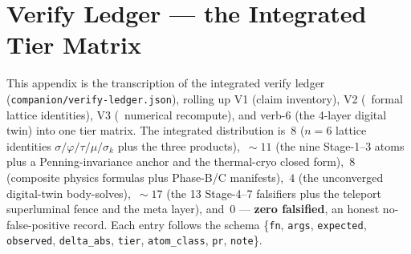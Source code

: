 \section{Verify Ledger --- the Integrated Tier Matrix}
\label{app:ledger}

This appendix is the transcription of the integrated verify ledger
(\texttt{companion/verify-ledger.json}), rolling up V1 (claim
inventory), V2 (\tierBlue\ formal lattice identities), V3 (\tierGreen\
numerical recompute), and verb-6 (the 4-layer digital twin) into one
tier matrix. The integrated distribution is \tierBlue$\,8$
($n\!=\!6$ lattice identities $\sigma/\varphi/\tau/\mu/\sigma_k$ plus the
three products), \tierGreen$\,\sim\!11$ (the nine Stage-1--3 atoms plus a
Penning-invariance anchor and the thermal-cryo closed form),
\tierYellow$\,8$ (composite physics formulas plus Phase-B/C manifests),
\tierOrange$\,4$ (the unconverged digital-twin body-solves),
\tierWhite$\,\sim\!17$ (the 13 Stage-4--7 falsifiers plus the teleport
superluminal fence and the meta layer), and \tierRed$\,0$ ---
\textbf{zero falsified}, an honest no-false-positive record. Each entry
follows the schema \{\texttt{fn}, \texttt{args}, \texttt{expected},
\texttt{observed}, \texttt{delta\_abs}, \texttt{tier},
\texttt{atom\_class}, \texttt{pr}, \texttt{note}\}.

